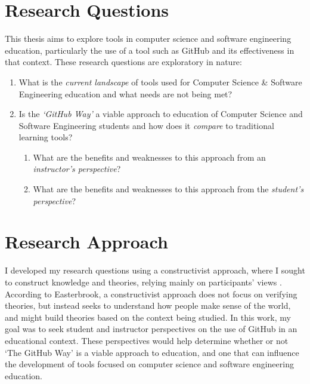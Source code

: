 
\section{Research Questions}
This thesis aims to explore tools in computer science and software engineering education, particularly the use of a tool such as GitHub and its effectiveness in that context. These research questions are exploratory in nature: \\
\begin{enumerate}
\item What is the \emph{current landscape} of tools used for Computer Science \& Software Engineering education and what needs are not being met?
\item Is the \emph{`GitHub Way'} a viable approach to education of Computer Science and Software Engineering students and how does it \emph{compare} to traditional learning tools?
\begin{enumerate}
    \item What are the benefits and weaknesses to this approach from an \emph{instructor's perspective}?
    \item What are the benefits and weaknesses to this approach from the \emph{student's perspective}?
\end{enumerate}
\end{enumerate}

\section{Research Approach}
I developed my research questions using a constructivist approach, where I sought to construct knowledge and theories, relying mainly on participants' views \cite{easterbrook2008selecting}. According to Easterbrook, a constructivist approach does not focus on verifying theories, but instead seeks to understand how people make sense of the world, and might build theories based on the context being studied. In this work, my goal was to seek student and instructor perspectives on the use of GitHub in an educational context. These perspectives would help determine whether or not `The GitHub Way' is a viable approach to education, and one that can influence the development of tools focused on computer science and software engineering education.


